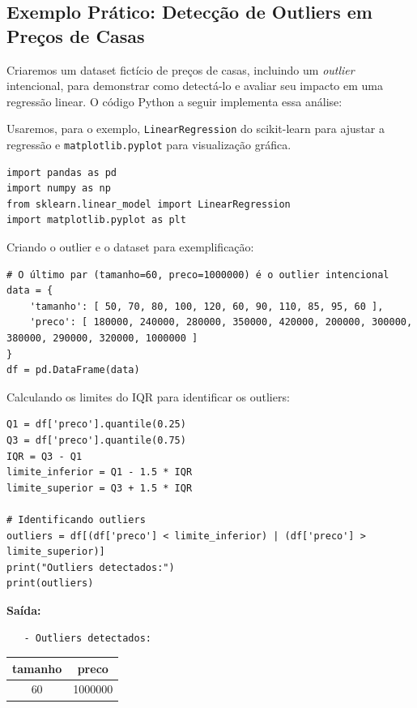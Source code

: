 \documentclass[a4paper,12pt,openany]{book}
\begin{document}
\subsection{Exemplo Prático: Detecção de Outliers em Preços de Casas}
Criaremos um dataset fictício de preços de casas, incluindo um \textit{outlier} intencional, para demonstrar como detectá-lo e avaliar seu impacto em uma regressão linear. O código Python a seguir implementa essa análise:

Usaremos, para o exemplo, \texttt{LinearRegression} do scikit-learn para ajustar a regressão e \texttt{matplotlib.pyplot} para visualização gráfica. 
\begin{verbatim}
import pandas as pd
import numpy as np
from sklearn.linear_model import LinearRegression
import matplotlib.pyplot as plt
\end{verbatim}   

Criando o outlier e o dataset para exemplificação:
\begin{verbatim}
# O último par (tamanho=60, preco=1000000) é o outlier intencional
data = {
    'tamanho': [ 50, 70, 80, 100, 120, 60, 90, 110, 85, 95, 60 ],
    'preco': [ 180000, 240000, 280000, 350000, 420000, 200000, 300000, 380000, 290000, 320000, 1000000 ]
}
df = pd.DataFrame(data)
\end{verbatim}    

Calculando os limites do IQR para identificar os outliers:

\begin{verbatim}
Q1 = df['preco'].quantile(0.25)
Q3 = df['preco'].quantile(0.75)
IQR = Q3 - Q1
limite_inferior = Q1 - 1.5 * IQR
limite_superior = Q3 + 1.5 * IQR

# Identificando outliers
outliers = df[(df['preco'] < limite_inferior) | (df['preco'] > limite_superior)]
print("Outliers detectados:")
print(outliers)
\end{verbatim}

\textbf{Saída:}  
\begin{verbatim}
   - Outliers detectados:  
\end{verbatim}
  \begin{tabular}{|c|c|}  
    \hline  
    tamanho & preco \\  
    \hline  
    60 & 1000000 \\  
    \hline  
  \end{tabular}
  
\vspace{1cm}
\end{document}
